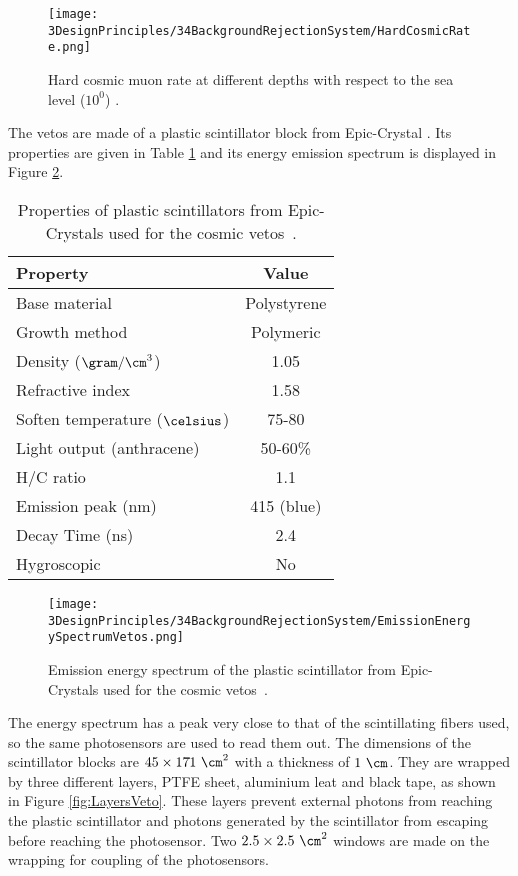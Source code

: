 \begin{figure}[h]
\centering
\texttt{[image: 3DesignPrinciples/34BackgroundRejectionSystem/HardCosmicRate.png]}
\caption{Hard cosmic muon rate at different depths with respect to the sea level ($10^0$) \cite{HardCosmicMuonRatePlot}.\label{fig:HardCoscmicRate}}
\end{figure}

The vetos are made of a plastic scintillator block from Epic-Crystal \cite{ScintillatorVeto}. Its properties are given in Table \ref{tab:ParametersScintillatorVeto} and its energy emission spectrum is displayed in Figure \ref{fig:EmissionEnergySpectrumVeto}.

\begin{table}[htbp]
\centering{}%
\begin{tabular}{lc}
\toprule 
Property & Value \tabularnewline
\midrule
\midrule 
Base material & Polystyrene \tabularnewline
Growth method & Polymeric \tabularnewline
Density ($\gram/\cm^3$)& 1.05 \tabularnewline
Refractive index & 1.58 \tabularnewline
Soften temperature ($\celsius$) & 75-80 \tabularnewline
Light output (anthracene) & 50-60\% \tabularnewline
H/C ratio & 1.1 \tabularnewline
Emission peak (nm) & 415 (blue) \tabularnewline
Decay Time (ns) & 2.4 \tabularnewline
Hygroscopic & No \tabularnewline
\bottomrule
\end{tabular}
\caption{Properties of plastic scintillators from Epic-Crystals used for the cosmic vetos~\cite{ScintillatorVeto}.}
\label{tab:ParametersScintillatorVeto}
\end{table}

\begin{figure}[]
\centering
\texttt{[image: 3DesignPrinciples/34BackgroundRejectionSystem/EmissionEnergySpectrumVetos.png]}
\caption{Emission energy spectrum of the plastic scintillator from Epic-Crystals used for the cosmic vetos\label{fig:EmissionEnergySpectrumVeto}~\cite{ScintillatorVeto}.}
\end{figure}

The energy spectrum has a peak very close to that of the scintillating fibers used, so the same photosensors are used to read them out. The dimensions of the scintillator blocks are $45 \times 17 \dot{} 1~\cm^2$ with a thickness of $1~\cm$. They are wrapped by three different layers, PTFE sheet, aluminium leat and black tape, as shown in Figure \ref{fig:LayersVeto}. These layers prevent external photons from reaching the plastic scintillator and photons generated by the scintillator from escaping before reaching the photosensor. Two $2.5\times 2.5 ~\cm^2$ windows are made on the wrapping for coupling of the photosensors.


